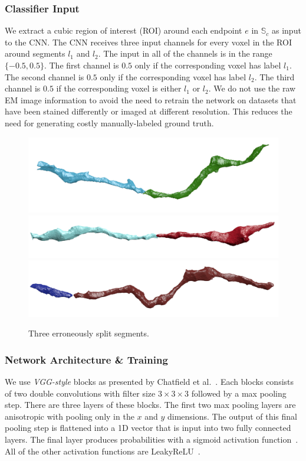 \subsubsection{Classifier Input}

We extract a cubic region of interest (ROI) around each endpoint $e$ in $\mathbb{S}_c$ as input to the CNN. 
The CNN receives three input channels for every voxel in the ROI around segments $l_1$ and $l_2$. 
The input in all of the channels is in the range $\{-0.5, 0.5\}$. 
The first channel is $0.5$ only if the corresponding voxel has label $l_1$. 
The second channel is $0.5$ only if the corresponding voxel has label $l_2$. 
The third channel is $0.5$ if the corresponding voxel is either $l_1$ or $l_2$.
We do not use the raw EM image information to avoid the need to retrain the network on datasets that have been stained differently or imaged at different resolution. 
This reduces the need for generating costly manually-labeled ground truth. 

\begin{figure}[t]
	\centering
	\includegraphics[width=0.32\linewidth]{./figures/split_error1.png}
	\includegraphics[width=0.32\linewidth]{./figures/split_error2.png}		\includegraphics[width=0.32\linewidth]{./figures/split_error3.png}
	\caption{Three erroneously split segments.}
	\label{fig:merge_candidates}
\end{figure}

\subsubsection{Network Architecture \& Training}

We use \textit{VGG-style} blocks as presented by Chatfield et al.~\cite{chatfield2014return}. 
Each blocks consists of two double convolutions with filter size $3\times3\times3$ followed by a max pooling step. 
There are three layers of these blocks. 
The first two max pooling layers are anisotropic with pooling only in the $x$ and $y$ dimensions. 
The output of this final pooling step is flattened into a 1D vector that is input into two fully connected layers. 
The final layer produces probabilities with a sigmoid activation function~\cite{funahashi1989approximate}. 
All of the other activation functions are LeakyReLU~\cite{maas2013rectifier}.

